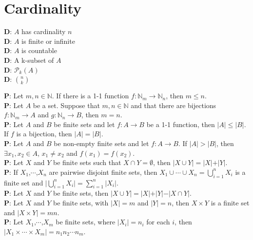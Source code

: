 \documentclass[a4paper]{article}
\begin{document}
\section*{Cardinality}
\begin{multicols}{3}
	\noindent
	\textbf{D}: $A$ has cardinality $n$\\
	\textbf{D}: $A$ is finite or infinite\\
	\textbf{D}: $A$ is countable\\
	\textbf{D}: A k-subset of $A$\\
	\textbf{D}: $\mathcal{P}_k(A)$\\
	\textbf{D}: $\binom{n}{k}$
\end{multicols}
	\noindent
	\textbf{P}: Let $m,n \in \mathbb{N}$. If there is a 1-1 function $f: \mathbb{N}_m \rightarrow \mathbb{N}_n$, then $m \leq n$.\\
	\textbf{P}: Let $A$ be a set. Suppose that $m,n \in \mathbb{N}$ and that there are bijections
$f: \mathbb{N}_m \rightarrow A$ and $g: \mathbb{N}_n \rightarrow B$, then $m = n$.\\
	\textbf{P}: Let $A$ and $B$ be finite sets and let $f: A \rightarrow B$ be a 1-1 function, then $\vert A\vert \leq \vert B\vert$.
If $f$ is a bijection, then $\vert A\vert = \vert B\vert$.\\
	\textbf{P}: Let $A$ and $B$ be non-empty finite sets and let $f: A \rightarrow B$. If $\vert A\vert > \vert B\vert$, then $\exists x_1,x_2 \in A$, $x_1 \neq x_2$ and $f(x_1)=f(x_2)$.\\
	\textbf{P}: Let $X$ and $Y$ be finite sets such that $X \cap Y = \emptyset$, then $\vert X \cup Y \vert = \vert X \vert + \vert Y \vert$.\\
	\textbf{P}: If $X_1$,$\cdots$,$X_n$ are pairwise disjoint finite sets, then $X_1 \cup \cdots \cup X_n = \bigcup\limits_{i=1}^nX_i$ is a finite set and $\vert \bigcup\limits_{i=1}^nX_i \vert = \sum\limits_{i=1}^n\vert X_i \vert$.\\
	\textbf{P}: Let $X$ and $Y$ be finite sets, then $\vert X \cup Y\vert = \vert X \vert + \vert Y\vert - \vert X \cap Y\vert$.\\
	\textbf{P}: Let $X$ and $Y$ be finite sets, with $\vert X \vert = m$ and $\vert Y \vert = n$, then $X \times Y$ is a finite set and $\vert X \times Y \vert = mn$.\\
	\textbf{P}: Let $X_1$,$\cdots$,$X_m$ be finite sets, where $\vert X_i \vert = n_i$ for each $i$, then $\vert X_1 \times \cdots \times X_m \vert = n_1n_2\cdots n_m$.\\
\end{document}
